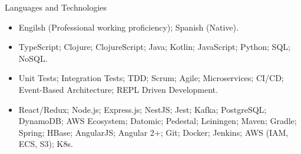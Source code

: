 \documentclass[calibri]{../mcdowell-cv/mcdowellcv}
\begin{document}
	\begin{cvsection}{Languages and Technologies}
		\begin{cvsubsection}{}{}{}	
			\begin{itemize}
				\item Engilsh (Professional working proficiency); Spanish (Native).
				\item TypeScript; Clojure; ClojureScript; Java; Kotlin; JavaScript; Python; SQL; NoSQL.
				\item Unit Tests; Integration Tests; TDD; Scrum; Agile; Microservices; CI/CD; Event-Based Architecture; REPL Driven Development.
				\item React/Redux; Node.js; Express.js; NestJS; Jest; Kafka; PostgreSQL; DynamoDB; AWS Ecosystem; Datomic; Pedestal; Leiningen; Maven; Gradle; Spring; HBase; AngularJS; Angular 2+; Git; Docker; Jenkins; AWS (IAM, ECS, S3); K8s.
			\end{itemize}
		\end{cvsubsection}
	\end{cvsection}
\end{document}

